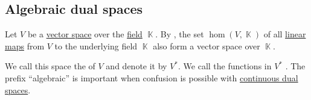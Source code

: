 \subsection{Algebraic dual spaces}\label{subsec:algebraic_dual_spaces}

\begin{definition}\label{def:dual_vector_space}
  Let \( V \) be a \hyperref[def:vector_space]{vector space} over the \hyperref[def:field]{field} \( \BbbK \). By , the set \( \hom(V, \BbbK) \) of all \hyperref[def:semimodule/homomorphism]{linear maps} from \( V \) to the underlying field \( \BbbK \) also form a vector space over \( \BbbK \).

  We call this space the  of \( V \) and denote it by \( V^* \). We call the functions in \( V^* \) . The prefix \enquote{algebraic} is important when confusion is possible with \hyperref[def:continuous_dual_space]{continuous dual spaces}.
\end{definition}

